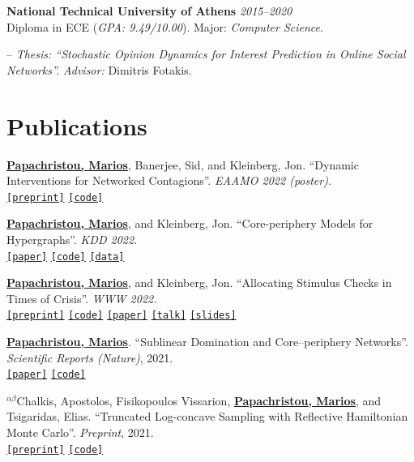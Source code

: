 \documentclass[margin]{res}
\newcommand{\field}[2]{\noindent \textbf{#1} \hfill #2 \\}
\newcommand{\alphabeticalorder}[0]{\ensuremath {^{\alpha \beta}}}
\newcommand{\specialurl}[2]{\href {#2} {\texttt{[#1]}}}
\newcommand{\preprint}[1]{\specialurl {preprint} {#1}}
\newcommand{\code}[1]{\specialurl {code} {#1}}
\newcommand{\data}[1]{\specialurl {data} {#1}}
\newcommand{\talk}[1]{\specialurl {talk} {#1}}
\newcommand{\slides}[1]{\specialurl {slides} {#1}}
\newcommand{\paper}[1]{\specialurl {paper} {#1}}
\newcommand{\authorref}[1]{\underline {\textbf{#1}}}
\newcommand{\authorme}{\authorref{Papachristou, Marios}}
\begin{document}
\begin{resume}
\field{National Technical University of Athens}  {\emph{2015--2020}} 
Diploma in ECE (\emph{GPA: 9.49/10.00}). Major: \emph{Computer Science}.
\begin{compactitem}
\item[--] \emph{Thesis: ``Stochastic Opinion Dynamics for Interest Prediction in Online Social Networks''.} \emph{Advisor:} Dimitris Fotakis.

\end{compactitem} 

\section{Publications}

\begin{compactenum}
   \item \authorme, Banerjee, Sid, and Kleinberg, Jon. ``Dynamic Interventions for Networked Contagions''. \emph{EAAMO 2022 (poster)}. \\
		\preprint{https://arxiv.org/abs/2205.13394} \code{https://github.com/papachristoumarios/dynamic-clearing}
   \item \authorme, and Kleinberg, Jon. ``Core-periphery Models for Hypergraphs''. \emph{KDD 2022.} \\
   \paper{https://arxiv.org/abs/2206.00783} \code{https://doi.org/10.5281/zenodo.5965849} \data{https://doi.org/10.5281/zenodo.5943043}
   \item  \authorme, and Kleinberg, Jon. ``Allocating Stimulus Checks in Times of Crisis''. \emph{WWW 2022.} \\\preprint{https://arxiv.org/abs/2106.07560} \code{https://github.com/papachristoumarios/financial-contagion} \paper{https://doi.org/10.1145/3485447.3512047} \talk{https://youtu.be/WUmPBztK8Mo} \slides{https://drive.google.com/file/d/1v4v4jPOTzFtP8a5dhAFLoIjZSRDxAjBz/view?usp=sharing}    
   \item \authorme. ``Sublinear Domination and Core--periphery Networks''. \emph{Scientific Reports (Nature)}, 2021. \\ \paper{http://www.nature.com/articles/s41598-021-94105-8} \code{https://bit.ly/3wKNGI0} 
    \item \alphabeticalorder Chalkis, Apostolos, Fisikopoulos Vissarion, \authorme, and Tsigaridas, Elias. ``Truncated Log-concave Sampling with Reflective Hamiltonian Monte Carlo''.  \emph{Preprint}, 2021. \\ \preprint{https://arxiv.org/abs/2102.13068} \code{https://github.com/GeomScale/volume_approximation}

\end{compactenum}
\end{resume}
\end{document}
